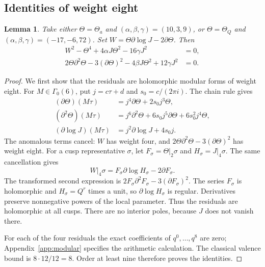 \documentclass[11pt,a4paper]{article}
\newtheorem{lemma}[theorem]{Lemma}
\theoremstyle{remark}
\newcommand{\dd}{\partial}
\newcommand{\Gbase}{\Gamma_0(6)}
\begin{document}
\subsection{Identities of weight eight}
\begin{lemma}\label{lem:period}
Take either $\Theta=\Theta_a$ and $(\alpha,\beta,\gamma)=(10,3,9)$,
or $\Theta=\Theta_Q$ and $(\alpha,\beta,\gamma)=(-17,-6,72)$.
Set $W=\Theta\dd\log J-2\dd\Theta$. Then
\begin{align}
 W^2-\Theta^4+4\alpha J\Theta^2-16\gamma J^2&=0,\label{eq:weight8-one}\\
 2\Theta\dd^2\Theta-3(\dd\Theta)^2
          -4\beta J\Theta^2+12\gamma J^2&=0.\label{eq:weight8-two}
\end{align}
\end{lemma}
\begin{proof}
We first show that the residuals are holomorphic modular forms of
weight eight. For $M\in\Gbase$, put $j=c\tau+d$ and
$s_0=c/(2\pi i)$. The chain rule gives
\begin{align*}
 (\dd\Theta)(M\tau)&=j^4\dd\Theta+2s_0j^3\Theta,\\
 (\dd^2\Theta)(M\tau)&=j^6\dd^2\Theta
                    +6s_0j^5\dd\Theta+6s_0^2j^4\Theta,\\
 (\dd\log J)(M\tau)&=j^2\dd\log J+4s_0j.
\end{align*}
The anomalous terms cancel: $W$ has weight four, and
$2\Theta\dd^2\Theta-3(\dd\Theta)^2$ has weight eight.
For a cusp representative $\sigma$, let
$F_\sigma=\Theta|_2\sigma$ and $H_\sigma=J|_4\sigma$.
The same cancellation gives
\[
 W|_4\sigma=F_\sigma\dd\log H_\sigma-2\dd F_\sigma.
\]
The transformed second expression is
$2F_\sigma\dd^2F_\sigma-3(\dd F_\sigma)^2$.
The series $F_\sigma$ is holomorphic and
$H_\sigma=Q^r$ times a unit, so $\dd\log H_\sigma$ is regular.
Derivatives preserve nonnegative powers of the local parameter.
Thus the residuals are holomorphic at all cusps. There are no
interior poles, because $J$ does not vanish there.

For each of the four residuals the exact coefficients of
$q^0,\ldots,q^8$ are zero; Appendix~\ref{app:modular} specifies the
arithmetic calculation. The classical valence bound
\cite[Theorem~1.1(1)]{craig} is $8\cdot12/12=8$.
Order at least nine therefore proves the identities.
\end{proof}
\end{document}
